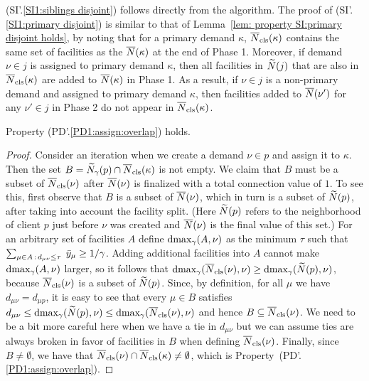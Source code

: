 (SI'.\ref{SI1:siblings disjoint}) follows directly from the
algorithm. The proof of (SI'.\ref{SI1:primary disjoint}) is similar to
that of Lemma~\ref{lem: property SI:primary disjoint holds}, by noting
that for a primary demand $\kappa$, ${\overline{N}}_{\text{cls}}(\kappa)$ contains the
same set of facilities as the ${\overline{N}}(\kappa)$ at the end of Phase
1. Moreover, if demand $\nu\in j$ is assigned to primary demand
$\kappa$, then all facilities in ${\widetilde N}(j)$ that are also in
${\overline{N}}_{\text{cls}}(\kappa)$ are added to ${\overline{N}}(\kappa)$ in Phase 1. As a
result, if $\nu \in j$ is a non-primary demand and assigned to primary
demand $\kappa$, then facilities added to ${\overline{N}}(\nu')$ for any
$\nu'\in j$ in Phase 2 do not appear in ${\overline{N}}_{\text{cls}}(\kappa)$.


\begin{lemma} \label{lem: PD1: primary overlap}
  Property (PD'.\ref{PD1:assign:overlap}) holds.
\end{lemma}
\begin{proof}
Consider an iteration when we create a demand $\nu\in p$ and assign it
to $\kappa$. Then the set $B={\widetilde N}_{\gamma}(p)\cap
{\overline{N}}_{\text{cls}}(\kappa)$ is not empty.  We claim that $B$ must be a subset
of ${\overline{N}}_{\text{cls}}(\nu)$ after ${\overline{N}}(\nu)$ is finalized with a total
connection value of $1$. To see this, first observe that $B$ is a
subset of ${\overline{N}}(\nu)$, which in turn is a subset of ${\widetilde N}(p)$,
after taking into account the facility split. (Here ${\widetilde N}(p)$
refers to the neighborhood of client $p$ just before $\nu$ was created
and ${\overline{N}}(\nu)$ is the final value of this set.)  For an arbitrary
set of facilities $A$ define $\text{dmax}_\gamma(A, \nu)$ as the minimum
$\tau$ such that $\sum_{\mu\in A {\,:\,} d_{\mu\nu} \leq
  \tau}\;{\bar y}_{\mu} \geq 1/\gamma$.  Adding additional facilities
into $A$ cannot make $\text{dmax}_\gamma(A, \nu)$ larger, so it follows that
$\text{dmax}_\gamma ({\overline{N}}_{\text{cls}}(\nu), \nu) \geq \text{dmax}_\gamma({\widetilde N}(p),
\nu)$, because ${\overline{N}}_{\text{cls}}(\nu)$ is a subset of ${\widetilde N}(p)$. Since,
by definition, for all $\mu$ we have $d_{\mu \nu} = d_{\mu p}$, it is
easy to see that every $\mu \in B$ satisfies $d_{\mu \nu} \leq
\text{dmax}_\gamma({\widetilde N}(p), \nu) \leq \text{dmax}_\gamma({\overline{N}}_{\text{cls}}(\nu),
\nu)$ and hence $B\subseteq {\overline{N}}_{\text{cls}}(\nu)$. We need to be a bit more
careful here when we have a tie in $d_{\mu\nu}$ but we can assume ties
are always broken in favor of facilities in $B$ when defining
${\overline{N}}_{\text{cls}}(\nu)$. Finally, since $B\neq\emptyset$, we have that
${\overline{N}}_{\text{cls}}(\nu)\cap {\overline{N}}_{\text{cls}}(\kappa)\neq\emptyset$, which is
Property~(PD'.\ref{PD1:assign:overlap}).
\end{proof}

